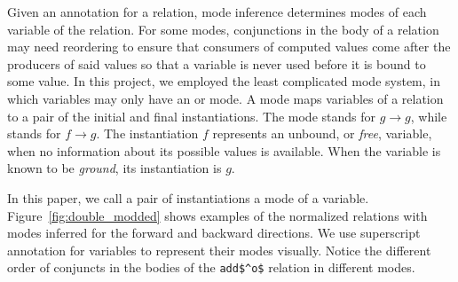 Given an annotation for a relation, mode inference determines modes of each variable of the relation.
For some modes, conjunctions in the body of a relation may need reordering to ensure that consumers of computed values come after the producers of said values so that a variable is never used before it is bound to some value.
In this project, we employed the least complicated mode system, in which variables may only have an \inm or \outm mode.
A mode maps variables of a relation to a pair of the initial and final instantiations.
The mode \inm stands for $g \rightarrow g$, while \outm stands for $f \rightarrow g$.
The instantiation $f$ represents an unbound, or \emph{free}, variable, when no information about its possible values is available.
When the variable is known to be \emph{ground}, its instantiation is $g$.

In this paper, we call a pair of instantiations a mode of a variable.
Figure~\ref{fig:double_modded} shows examples of the normalized \mk relations with modes inferred for the forward and backward directions.
We use superscript annotation for variables to represent their modes visually.
Notice the different order of conjuncts in the bodies of the \lstinline{add$^o$} relation in different modes.



